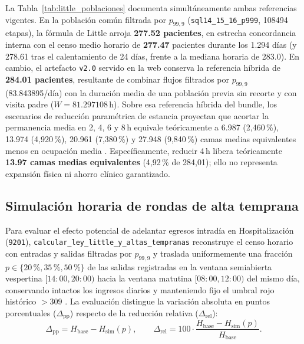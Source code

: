 La Tabla~\ref{tab:little_poblaciones} documenta simultáneamente ambas referencias vigentes. En la población común filtrada por $p_{99{,}9}$ (\texttt{sql14\_15\_16\_p999}, \num{108494} etapas), la fórmula de Little arroja \textbf{\num{277,52} pacientes}, en estrecha concordancia interna con el censo medio horario de \textbf{\num{277,47}} pacientes durante los 1.294 días (y \num{278,61} tras el calentamiento de 24 días, frente a la mediana horaria de \num{283,0}). En cambio, el artefacto \texttt{v2.0} servido en la web conserva la referencia híbrida de \textbf{\num{284,01} pacientes}, resultante de combinar flujos filtrados por $p_{99{,}9}$ (\num{83,843895}/día) con la duración media de una población previa sin recorte y con visita padre ($W = \num{81,297108}\,\text{h}$). Sobre esa referencia híbrida del bundle, los escenarios de reducción paramétrica de estancia proyectan que acortar la permanencia media en 2, 4, 6 y 8\,h equivale teóricamente a \num{6,987} (2,460\,\%), \num{13,974} (4,920\,\%), \num{20,961} (7,380\,\%) y \num{27,948} (9,840\,\%) camas medias equivalentes menos en ocupación media \parencite{mediflow2026optimizacion,mediflow2026bundle}. Específicamente, reducir 4\,h libera teóricamente \textbf{\num{13,97} camas medias equivalentes} (4,92\,\% de 284,01); ello no representa expansión física ni ahorro clínico garantizado.

\subsection{Simulación horaria de rondas de alta temprana}

Para evaluar el efecto potencial de adelantar egresos intradía en Hospitalización (\texttt{9201}), \texttt{calcular\_ley\_little\_y\_altas\_tempranas} reconstruye el censo horario con entradas y salidas filtradas por $p_{99{,}9}$ y traslada uniformemente una fracción $p \in \{20\,\%, 35\,\%, 50\,\%\}$ de las salidas registradas en la ventana semiabierta vespertina $[14{:}00, 20{:}00)$ hacia la ventana matutina $[08{:}00, 12{:}00)$ del mismo día, conservando intactos los ingresos diarios y manteniendo fijo el umbral rojo histórico $> 309$ \parencite{mediflow2026optimizacion}. La evaluación distingue la variación absoluta en puntos porcentuales ($\Delta_{\text{pp}}$) respecto de la reducción relativa ($\Delta_{\text{rel}}$):
\begin{equation}
\label{eq:reduccion_rojas}
\Delta_{\text{pp}} = H_{\text{base}} - H_{\text{sim}}(p), \qquad
\Delta_{\text{rel}} = 100 \cdot \frac{H_{\text{base}} - H_{\text{sim}}(p)}{H_{\text{base}}}.
\end{equation}

